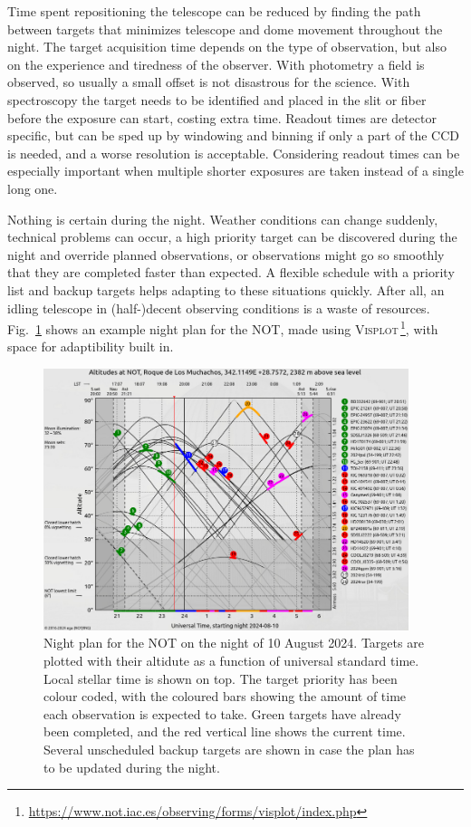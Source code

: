 \documentclass[a4paper,oneside,12pt, class=Latex/Classes/PhDthesisPSnPDF, crop=false]{standalone}
\begin{document}
Time spent repositioning the telescope can be reduced by finding the path between targets that minimizes telescope and dome movement throughout the night. The target acquisition time depends on the type of observation, but also on the experience and tiredness of the observer. With photometry a field is observed, so usually a small offset is not disastrous for the science. With spectroscopy the target needs to be identified and placed in the slit or fiber before the exposure can start, costing extra time. Readout times are detector specific, but can be sped up by windowing and binning if only a part of the CCD is needed, and a worse resolution is acceptable. Considering readout times can be especially important when multiple shorter exposures are taken instead of a single long one.

Nothing is certain during the night. Weather conditions can change suddenly, technical problems can occur, a high priority target can be discovered during the night and override planned observations, or observations might go so smoothly that they are completed faster than expected. A flexible schedule with a priority list and backup targets helps adapting to these situations quickly. After all, an idling telescope in (half-)decent observing conditions is a waste of resources. Fig.~\ref{visplot} shows an example night plan for the NOT, made using \textsc{Visplot}\,\footnote{\url{https://www.not.iac.es/observing/forms/visplot/index.php}}, with space for adaptibility built in.

\begin{figure}
    \centering
    \includegraphics[width=0.95\textwidth]{../Images/chapter_2/visplot.png}
    \caption{Night plan for the NOT on the night of 10 August 2024. Targets are plotted with their altidute as a function of universal standard time. Local stellar time is shown on top. The target priority has been colour coded, with the coloured bars showing the amount of time each observation is expected to take. Green targets have already been completed, and the red vertical line shows the current time. Several unscheduled backup targets are shown in case the plan has to be updated during the night.}
    \label{visplot}
\end{figure}
\end{document}
